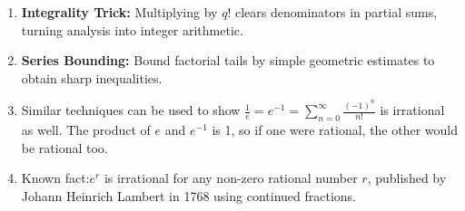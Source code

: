 \begin{takeaways}
\begin{enumerate}
    \item \textbf{Integrality Trick:} Multiplying by $q!$ clears denominators in partial sums, turning analysis into integer arithmetic.
    \item \textbf{Series Bounding:} Bound factorial tails by simple geometric estimates to obtain sharp inequalities.
    \item Similar techniques can be used to show $\frac{1}{e} = e^{-1} = \sum_{n=0}^{\infty} \frac{(-1)^n}{n!}$ is irrational as well. The product of $e$ and $e^{-1}$ is 1, so if one were rational, the other would be rational too.
    \item Known fact:$e^r$ is irrational for any non-zero rational number $r$, published by Johann Heinrich Lambert in 1768 using continued fractions.
\end{enumerate}
\end{takeaways}
